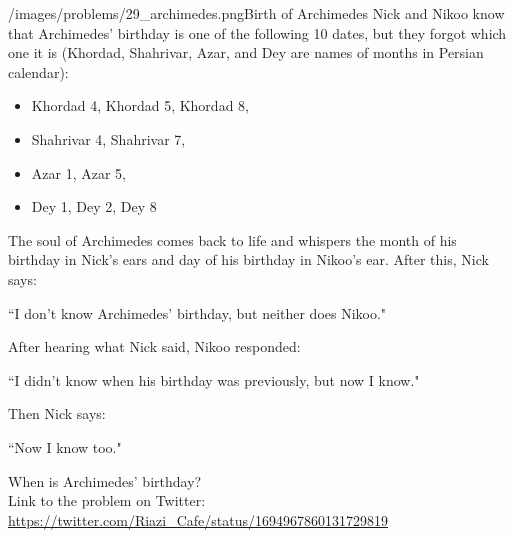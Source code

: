 \begin{problem}{/images/problems/29_archimedes.png}{Birth of Archimedes}
	Nick and Nikoo know that Archimedes' birthday is one of the following 10 dates, but they forgot which one it is (Khordad, Shahrivar, Azar, and Dey are names of months in Persian calendar):

\begin{itemize}
\item  Khordad 4, Khordad 5, Khordad 8,
\item  Shahrivar 4, Shahrivar 7, 
\item Azar 1, Azar 5,
\item  Dey 1, Dey 2, Dey 8
\end{itemize}

The soul of Archimedes comes back to life and whispers the month of his birthday in Nick's ears and day of his birthday in Nikoo's ear. After this, Nick says: 
\begin{center}
``I don't know Archimedes' birthday, but neither does Nikoo."
\end{center}

After hearing what Nick said, Nikoo responded:

\begin{center}
	``I didn't know when his birthday was previously, but now I know."
\end{center}

Then Nick says:

\begin{center}
	``Now I know too."
\end{center}

When is Archimedes' birthday?\\[0.2cm]

Link to the problem on Twitter:  \url{https://twitter.com/Riazi_Cafe/status/1694967860131729819}
\end{problem}
